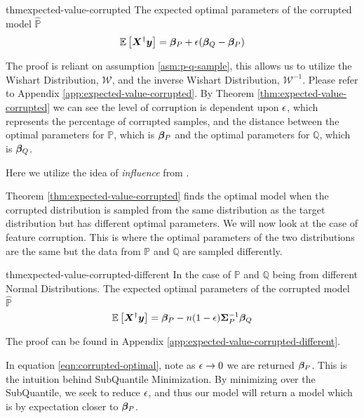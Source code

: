 \documentclass{article} %
\begin{document}
	\begin{restatable}{thm}{expected-value-corrupted}\label{thm:expected-value-corrupted}
		The expected optimal parameters of the corrupted model $\hat{\mathbb{P}}$\vspace{1em}
		\begin{equation}
			\label{eqn:corrupted-optimal}
			\mathbb{E}\left[{\bm{X}}^{\dagger}{\bm{y}} \right] = {\bm{\beta}}_P + {\epsilon}({\bm{\beta}}_Q - {\bm{\beta}}_P)
		\end{equation}
	\end{restatable}
	The proof is reliant on assumption \ref{asm:p-q-sample}, this allows us to utilize the Wishart Distribution, $\mathcal{W}$, and the inverse Wishart Distribution, $\mathcal{W}^{-1}$. Please refer to Appendix \ref{app:expected-value-corrupted}. By Theorem \ref{thm:expected-value-corrupted} we can see the level of corruption is dependent upon ${\epsilon}$, which represents the percentage of corrupted samples, and the distance between the optimal parameters for $\mathbb{P}$, which is ${\bm{\beta}}_P$ and the optimal parameters for $\mathbb{Q}$, which is ${\bm{\beta}}_Q$. 
	
		
	Here we utilize the idea of \textit{influence} from \cite{McWilliams2014}.
	
	Theorem \ref{thm:expected-value-corrupted} finds the optimal model when the corrupted distribution is sampled from the same distribution as the target distribution but has different optimal parameters. We will now look at the case of feature corruption. This is where the optimal parameters of the two distributions are the same but the data from $\mathbb{P}$ and $\mathbb{Q}$ are sampled differently. 
	
	\begin{restatable}{thm}{expected-value-corrupted-different}\label{thm:expected-value-corrupted-different}
		In the case of $\mathbb{P}$ and $\mathbb{Q}$ being from different Normal Distributions. The expected optimal parameters of the corrupted model $\hat{\mathbb{P}}$\vspace{1em}
		\begin{equation}
			\mathbb{E}\left[{\bm{X}}^{\dagger}{\bm{y}} \right] = {\bm{\beta}}_P - n(1-{\epsilon}){\bm{\Sigma}}_P^{-1}{\bm{\beta}}_Q
		\end{equation}
	\end{restatable}
	The proof can be found in Appendix \ref{app:expected-value-corrupted-different}.
	
	In equation \ref{eqn:corrupted-optimal}, note as $\displaystyle {\epsilon} \to 0$ we are returned ${\bm{\beta}}_P$. This is the intuition behind SubQuantile Minimization. By minimizing over the SubQuantile, we seek to reduce ${\epsilon}$, and thus our model will return a model which is by expectation closer to ${\bm{\beta}}_P$. 	
\end{document}
